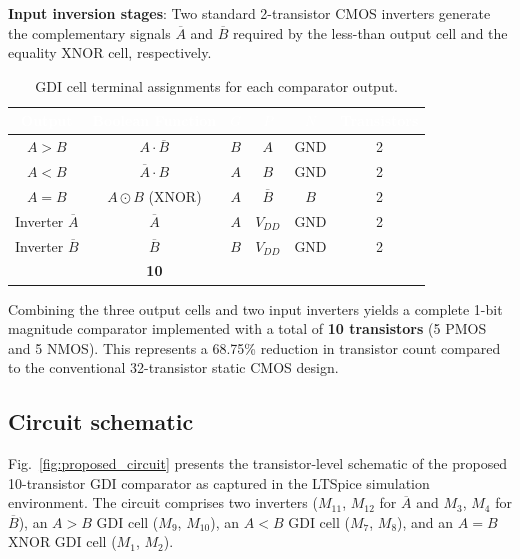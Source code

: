 \documentclass[final,5p,times,twocolumn]{elsarticle}
\begin{document}
\textbf{Input inversion stages}: Two standard 2-transistor CMOS inverters generate the complementary signals $\overline{A}$ and $\overline{B}$ required by the less-than output cell and the equality XNOR cell, respectively.

\begin{table}[t]
    \centering
    \caption{GDI cell terminal assignments for each comparator output.}
    \label{tab:gdi_mapping}
    \renewcommand{\arraystretch}{1.35}
    \setlength{\tabcolsep}{3.5pt}
    {\small
    \begin{tabular}{|c|c|c|c|c|c|}
        \hline
        \rowcolor{worddarkblue}
        \textcolor{white}{\textbf{Output}} & \textcolor{white}{\textbf{Boolean Function}} & \textcolor{white}{\textbf{$G$}} & \textcolor{white}{\textbf{$P$}} & \textcolor{white}{\textbf{$N$}} & \textcolor{white}{\textbf{Transistors}} \\
        \hline
        $A > B$ & $A \cdot \overline{B}$ & $B$ & $A$ & GND & 2 \\
        \hline
        \rowcolor{wordzebra}
        $A < B$ & $\overline{A} \cdot B$ & $A$ & $B$ & GND & 2 \\
        \hline
        $A = B$ & $A \odot B$ (XNOR) & $A$ & $\overline{B}$ & $B$ & 2 \\
        \hline
        \rowcolor{wordzebra}
        Inverter $\overline{A}$ & $\overline{A}$ & $A$ & $V_{DD}$ & GND & 2 \\
        \hline
        Inverter $\overline{B}$ & $\overline{B}$ & $B$ & $V_{DD}$ & GND & 2 \\
        \hline
        \rowcolor{wordlightblue}
        \multicolumn{5}{|r|}{\textbf{Total transistor count:}} & \textbf{10} \\
        \hline
    \end{tabular}
    }
\end{table}

Combining the three output cells and two input inverters yields a complete 1-bit magnitude comparator implemented with a total of \textbf{10 transistors} (5 PMOS and 5 NMOS). This represents a 68.75\% reduction in transistor count compared to the conventional 32-transistor static CMOS design.

\subsection{Circuit schematic}

Fig.~\ref{fig:proposed_circuit} presents the transistor-level schematic of the proposed 10-transistor GDI comparator as captured in the LTSpice simulation environment. The circuit comprises two inverters ($M_{11}$, $M_{12}$ for $\overline{A}$ and $M_3$, $M_4$ for $\overline{B}$), an $A>B$ GDI cell ($M_9$, $M_{10}$), an $A<B$ GDI cell ($M_7$, $M_8$), and an $A=B$ XNOR GDI cell ($M_1$, $M_2$).
\end{document}

